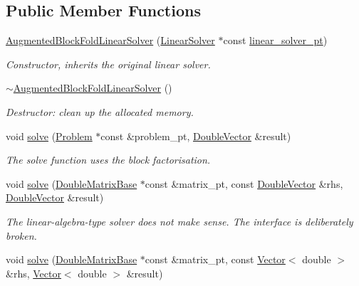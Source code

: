 \subsection*{Public Member Functions}
\begin{DoxyCompactItemize}
\item 
\hyperlink{classoomph_1_1AugmentedBlockFoldLinearSolver_a40e92987fc351227d16cb4c65c56988b}{Augmented\+Block\+Fold\+Linear\+Solver} (\hyperlink{classoomph_1_1LinearSolver}{Linear\+Solver} $\ast$const \hyperlink{classoomph_1_1AugmentedBlockFoldLinearSolver_a565f2b65d78f91ccac3fe2b03ac57dfc}{linear\+\_\+solver\+\_\+pt})
\begin{DoxyCompactList}\small\item\em Constructor, inherits the original linear solver. \end{DoxyCompactList}\item 
\hyperlink{classoomph_1_1AugmentedBlockFoldLinearSolver_adae26b8b348384e909bee9e57da6301d}{$\sim$\+Augmented\+Block\+Fold\+Linear\+Solver} ()
\begin{DoxyCompactList}\small\item\em Destructor\+: clean up the allocated memory. \end{DoxyCompactList}\item 
void \hyperlink{classoomph_1_1AugmentedBlockFoldLinearSolver_a11690b33089e999d0c894b4e4b0646d9}{solve} (\hyperlink{classoomph_1_1Problem}{Problem} $\ast$const \&problem\+\_\+pt, \hyperlink{classoomph_1_1DoubleVector}{Double\+Vector} \&result)
\begin{DoxyCompactList}\small\item\em The solve function uses the block factorisation. \end{DoxyCompactList}\item 
void \hyperlink{classoomph_1_1AugmentedBlockFoldLinearSolver_afdea4d6668393ad1cccc810b81fdc957}{solve} (\hyperlink{classoomph_1_1DoubleMatrixBase}{Double\+Matrix\+Base} $\ast$const \&matrix\+\_\+pt, const \hyperlink{classoomph_1_1DoubleVector}{Double\+Vector} \&rhs, \hyperlink{classoomph_1_1DoubleVector}{Double\+Vector} \&result)
\begin{DoxyCompactList}\small\item\em The linear-\/algebra-\/type solver does not make sense. The interface is deliberately broken. \end{DoxyCompactList}\item 
void \hyperlink{classoomph_1_1AugmentedBlockFoldLinearSolver_ae7f5f1459fef68479b39f0d1a1dce243}{solve} (\hyperlink{classoomph_1_1DoubleMatrixBase}{Double\+Matrix\+Base} $\ast$const \&matrix\+\_\+pt, const \hyperlink{classoomph_1_1Vector}{Vector}$<$ double $>$ \&rhs, \hyperlink{classoomph_1_1Vector}{Vector}$<$ double $>$ \&result)

\end{DoxyCompactItemize}
